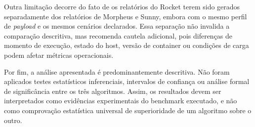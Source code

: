 Outra limitação decorre do fato de os relatórios do Rocket terem sido gerados separadamente dos relatórios de Morpheus e Sunny, embora com o mesmo perfil de \textit{payload} e os mesmos cenários declarados. Essa separação não invalida a comparação descritiva, mas recomenda cautela adicional, pois diferenças de momento de execução, estado do host, versão de container ou condições de carga podem afetar métricas operacionais.

Por fim, a análise apresentada é predominantemente descritiva. Não foram aplicados testes estatísticos inferenciais, intervalos de confiança ou análise formal de significância entre os três algoritmos. Assim, os resultados devem ser interpretados como evidências experimentais do benchmark executado, e não como comprovação estatística universal de superioridade de um algoritmo sobre o outro.
